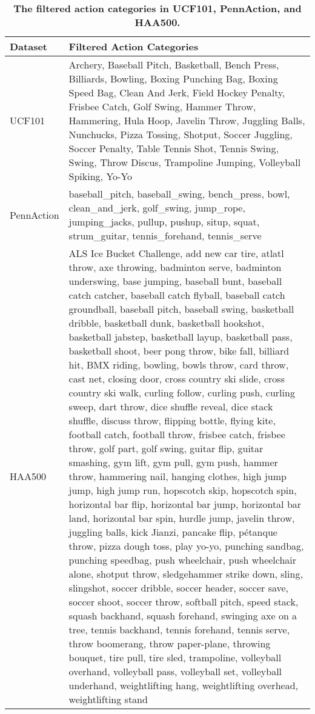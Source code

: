 \begin{table}[ht]
\centering
\setlength{\tabcolsep}{0pt}  %
\fontsize{6}{8}\selectfont  %
\renewcommand{\arraystretch}{1.05}  %
\begin{tabularx}{\columnwidth}{@{}>{\centering\arraybackslash}p{}@{}X@{}}
\toprule
\textbf{Dataset} & \textbf{Filtered Action Categories} \\
\midrule
UCF101 & Archery, Baseball Pitch, Basketball, Bench Press, Billiards, Bowling, Boxing Punching Bag, Boxing Speed Bag, Clean And Jerk, Field Hockey Penalty, Frisbee Catch, Golf Swing, Hammer Throw, Hammering, Hula Hoop, Javelin Throw, Juggling Balls, Nunchucks, Pizza Tossing, Shotput, Soccer Juggling, Soccer Penalty, Table Tennis Shot, Tennis Swing, Swing, Throw Discus, Trampoline Jumping, Volleyball Spiking, Yo-Yo \\
\midrule
PennAction & baseball\_pitch, baseball\_swing, bench\_press, bowl, clean\_and\_jerk, golf\_swing, jump\_rope, jumping\_jacks, pullup, pushup, situp, squat, strum\_guitar, tennis\_forehand, tennis\_serve \\
\midrule
HAA500 & ALS Ice Bucket Challenge, add new car tire, atlatl throw, axe throwing, badminton serve, badminton underswing, base jumping, baseball bunt, baseball catch catcher, baseball catch flyball, baseball catch groundball, baseball pitch, baseball swing, basketball dribble, basketball dunk, basketball hookshot, basketball jabstep, basketball layup, basketball pass, basketball shoot, beer pong throw, bike fall, billiard hit, BMX riding, bowling, bowls throw, card throw, cast net, closing door, cross country ski slide, cross country ski walk, curling follow, curling push, curling sweep, dart throw, dice shuffle reveal, dice stack shuffle, discuss throw, flipping bottle, flying kite, football catch, football throw, frisbee catch, frisbee throw, golf part, golf swing, guitar flip, guitar smashing, gym lift, gym pull, gym push, hammer throw, hammering nail, hanging clothes, high jump jump, high jump run, hopscotch skip, hopscotch spin, horizontal bar flip, horizontal bar jump, horizontal bar land, horizontal bar spin, hurdle jump, javelin throw, juggling balls, kick Jianzi, pancake flip, pétanque throw, pizza dough toss, play yo-yo, punching sandbag, punching speedbag, push wheelchair, push wheelchair alone, shotput throw, sledgehammer strike down, sling, slingshot, soccer dribble, soccer header, soccer save, soccer shoot, soccer throw, softball pitch, speed stack, squash backhand, squash forehand, swinging axe on a tree, tennis backhand, tennis forehand, tennis serve, throw boomerang, throw paper-plane, throwing bouquet, tire pull, tire sled, trampoline, volleyball overhand, volleyball pass, volleyball set, volleyball underhand, weightlifting hang, weightlifting overhead, weightlifting stand \\
\bottomrule
\end{tabularx}
\caption{\textbf{The filtered action categories in UCF101, PennAction, and HAA500.}}
\label{tab:three_dataset}
\end{table}


